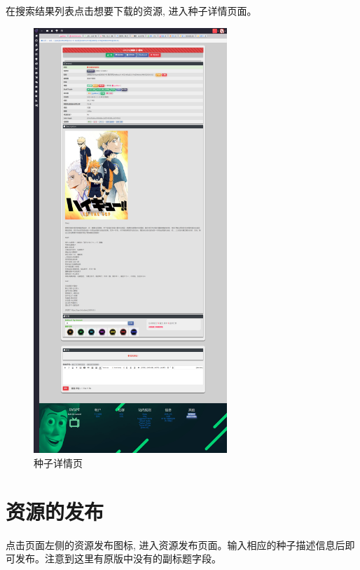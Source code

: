 在搜索结果列表点击想要下载的资源, 进入种子详情页面。

\begin{figure}[h]
    \centering
    \includegraphics[width=0.65\textwidth]{support-files/5.2-torrent-detail-page.png}
    \caption{种子详情页}
    \label{fig:torrentdetailpage}
\end{figure}

\section{资源的发布}

点击页面左侧的资源发布图标, 进入资源发布页面。输入相应的种子描述信息后即可发布。注意到这里有原版中没有的副标题字段。

